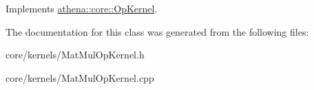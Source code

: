 Implements \mbox{\hyperlink{classathena_1_1core_1_1_op_kernel_a926afa57c90b4a999419cbbdc0496c65}{athena\+::core\+::\+Op\+Kernel}}.



The documentation for this class was generated from the following files\+:\begin{DoxyCompactItemize}
\item 
core/kernels/Mat\+Mul\+Op\+Kernel.\+h\item 
core/kernels/Mat\+Mul\+Op\+Kernel.\+cpp\end{DoxyCompactItemize}
